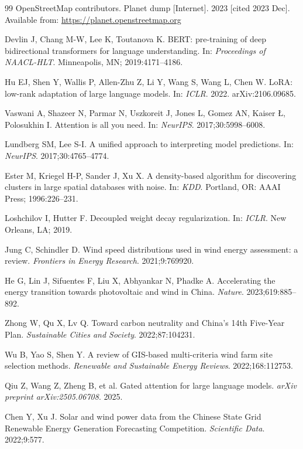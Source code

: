 \documentclass[12pt, a4paper]{article}
\begin{document}
\begin{thebibliography}{99}
OpenStreetMap contributors.
Planet dump [Internet].
2023 [cited 2023 Dec].
Available from: \url{https://planet.openstreetmap.org}

Devlin J, Chang M-W, Lee K, Toutanova K.
BERT: pre-training of deep bidirectional transformers for
language understanding.
In: \textit{Proceedings of NAACL-HLT}.
Minneapolis, MN; 2019:4171--4186.

Hu EJ, Shen Y, Wallis P, Allen-Zhu Z, Li Y,
Wang S, Wang L, Chen W.
LoRA: low-rank adaptation of large language models.
In: \textit{ICLR}. 2022. arXiv:2106.09685.

Vaswani A, Shazeer N, Parmar N, Uszkoreit J, Jones L,
Gomez AN, Kaiser \L, Polosukhin I.
Attention is all you need.
In: \textit{NeurIPS}. 2017;30:5998--6008.

Lundberg SM, Lee S-I.
A unified approach to interpreting model predictions.
In: \textit{NeurIPS}. 2017;30:4765--4774.

Ester M, Kriegel H-P, Sander J, Xu X.
A density-based algorithm for discovering clusters in large
spatial databases with noise.
In: \textit{KDD}. Portland, OR: AAAI Press; 1996:226--231.

Loshchilov I, Hutter F.
Decoupled weight decay regularization.
In: \textit{ICLR}. New Orleans, LA; 2019.

Jung C, Schindler D.
Wind speed distributions used in wind energy assessment: a review.
\textit{Frontiers in Energy Research}.
2021;9:769920.

He G, Lin J, Sifuentes F, Liu X, Abhyankar N, Phadke A.
Accelerating the energy transition towards photovoltaic
and wind in China.
\textit{Nature}.
2023;619:885--892.

Zhong W, Qu X, Lv Q.
Toward carbon neutrality and China's 14th Five-Year Plan.
\textit{Sustainable Cities and Society}.
2022;87:104231.

Wu B, Yao S, Shen Y.
A review of GIS-based multi-criteria wind farm site selection methods.
\textit{Renewable and Sustainable Energy Reviews}.
2022;168:112753.

Qiu Z, Wang Z, Zheng B, et al.
Gated attention for large language models.
\textit{arXiv preprint arXiv:2505.06708}. 2025.

Chen Y, Xu J.
Solar and wind power data from the Chinese State Grid
Renewable Energy Generation Forecasting Competition.
\textit{Scientific Data}.
2022;9:577.


\end{thebibliography}
\end{document}
